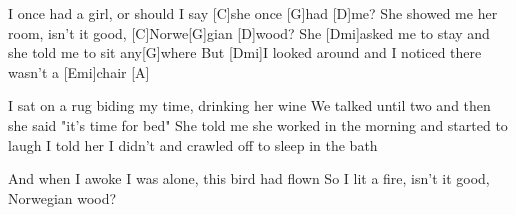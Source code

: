 
\sloka
[D]I once had a girl, or should I say [C]she once [G]had [D]me?
She showed me her room, isn’t it good, [C]Norwe[G]gian [D]wood?
She [Dmi]asked me to stay and she told me to sit any[G]where
But [Dmi]I looked around and I noticed there wasn’t a [Emi]chair [A]

\sloka
I sat on a rug biding my time, drinking her wine
We talked until two and then she said "it’s time for bed"
She told me she worked in the morning and started to laugh
I told her I didn’t and crawled off to sleep in the bath

\sloka
And when I awoke I was alone, this bird had flown
So I lit a fire, isn’t it good, Norwegian wood?
